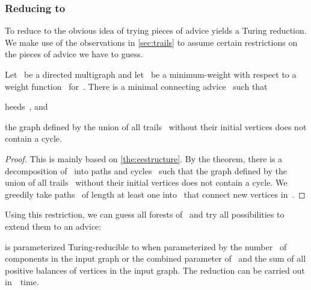 \subsubsection{Reducing \pWMEEs{} to \pWMEECAs{}} To reduce \pWMEEs{} to \pWMEECAs{} the obvious idea of trying pieces of advice yields a Turing reduction. We make use of the observations in \autoref{sec:trails} to assume certain restrictions on the pieces of advice we have to guess.
\begin{lemma}\label{lem:adstructure}
Let~ be a directed multigraph and let~ be a minimum-weight \EE{} with respect to a weight function~ for~. There is a minimal connecting advice~ such that
\begin{lemenum}
\item  heeds~, and
\item the graph defined by the union of all trails~ without their initial vertices does not contain a cycle.
\end{lemenum}
\end{lemma}
\begin{proof}
  This is mainly based on \autoref{the:eestructure}. By the theorem, there is a decomposition of~ into paths and cycles~ such that the graph defined by the union of all trails~ without their initial vertices does not contain a cycle. We greedily take paths~ of length at least one into~ that connect new vertices in~.
\end{proof}
Using this restriction, we can guess all forests of~ and try all possibilities to extend them to an advice:
\begin{lemma}\label{lem:redwmeetowmeea}
  \pWMEE{} is parameterized Turing-reducible to \pWMEECA{} when parameterized by the number~ of components in the input graph or the combined parameter of~ and the sum of all positive balances of vertices in the input graph. The reduction can be carried out in~~time.
\end{lemma}
